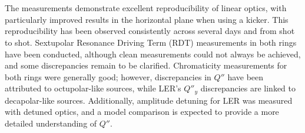 \FloatBarrier
\section{}

The measurements demonstrate excellent reproducibility of linear optics, with particularly improved
results in the horizontal plane when using a kicker. This reproducibility has been observed
consistently across several days and from shot to shot. Sextupolar Resonance Driving Term (RDT)
measurements in both rings have been conducted, although clean measurements could not always be
achieved, and some discrepancies remain to be clarified. Chromaticity measurements for both rings
were generally good; however, discrepancies in \( Q'' \) have been attributed to octupolar-like
sources, while LER’s \( Q''_y \) discrepancies are linked to decapolar-like sources. Additionally,
amplitude detuning for LER was measured with detuned optics, and a model comparison is expected to
provide a more detailed understanding of \( Q'' \).
